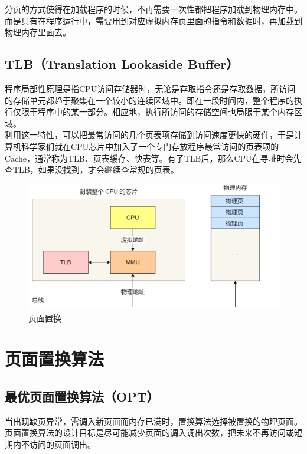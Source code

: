 分页的方式使得在加载程序的时候，不再需要一次性都把程序加载到物理内存中。而是只有在程序运行中，需要用到对应虚拟内存页里面的指令和数据时，再加载到物理内存里面去。\\

\subsection{TLB（Translation Lookaside Buffer）}

程序局部性原理是指CPU访问存储器时，无论是存取指令还是存取数据，所访问的存储单元都趋于聚集在一个较小的连续区域中。即在一段时间内，整个程序的执行仅限于程序中的某一部分。相应地，执行所访问的存储空间也局限于某个内存区域。\\

利用这一特性，可以把最常访问的几个页表项存储到访问速度更快的硬件，于是计算机科学家们就在CPU芯片中加入了一个专门存放程序最常访问的页表项的Cache，通常称为TLB、页表缓存、快表等。有了TLB后，那么CPU在寻址时会先查TLB，如果没找到，才会继续查常规的页表。

\begin{figure}[H]
    \centering
    \includegraphics[scale=0.4]{img/Chapter3/3-5/4.png}
    \caption{页面置换}
\end{figure}

\newpage

\section{页面置换算法}

\subsection{最优页面置换算法（OPT）}

当出现缺页异常，需调入新页面而内存已满时，置换算法选择被置换的物理页面。页面置换算法的设计目标是尽可能减少页面的调入调出次数，把未来不再访问或短期内不访问的页面调出。\\

